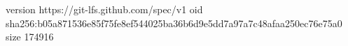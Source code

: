 version https://git-lfs.github.com/spec/v1
oid sha256:b05a871536e85f75fe8ef544025ba36b6d9e5dd7a97a7c48afaa250ec76e75a0
size 174916

